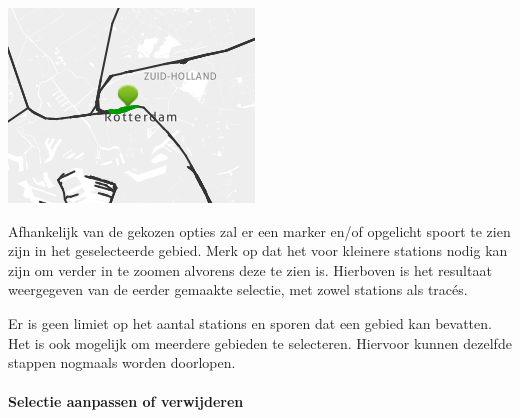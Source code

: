 \begin{center}
\includegraphics[scale=.7]{img/kaart4.png}
\end{center}
Afhankelijk van de gekozen opties zal er een marker en/of opgelicht spoort te zien zijn in het geselecteerde gebied. Merk op dat het voor kleinere stations nodig kan zijn om verder in te zoomen alvorens deze te zien is. Hierboven is het resultaat weergegeven van de eerder gemaakte selectie, met zowel stations als trac\'{e}s.

Er is geen limiet op het aantal stations en sporen dat een gebied kan bevatten. Het is ook mogelijk om meerdere gebieden te selecteren. Hiervoor kunnen dezelfde stappen nogmaals worden doorlopen.

\paragraph{Selectie aanpassen of verwijderen}


